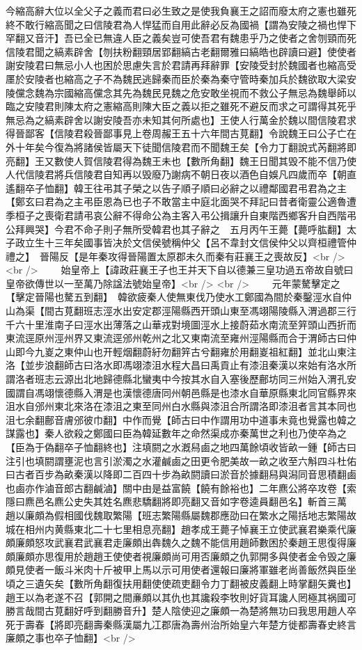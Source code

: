 今縮高辭大位以全父子之義而君曰必生致之是使我負襄王之詔而廢太府之憲也雖死終不敢行縮高聞之曰信陵君為人悍猛而自用此辭必反為國禍【謂為安陵之禍也悍下罕翻又音汗】吾已全已無違人臣之義矣豈可使吾君有魏患乎乃之使者之舍刎頸而死信陵君聞之縞素辟舍【刎扶粉翻頸居郢翻縞古老翻爾雅曰縞皓也辟讀曰避】使使者謝安陵君曰無忌小人也困於思慮失言於君請再拜辭罪【安陵受封於魏國者也縮高受㕓於安陵者也縮高之子不為魏民逃歸秦而臣於秦為秦守管時秦加兵於魏欲取大梁安陵儻念魏為宗國縮高儻念其先為魏民見魏之危安敢坐視而不救公子無忌為魏舉師以臨之安陵君則陳太府之憲縮高則陳大臣之義以拒之雖死不避反而求之可謂得其死乎無忌為之縞素辟舍以謝安陵吾亦未知其何所處也】王使人行萬金於魏以間信陵君求得晉鄙客【信陵君殺晉鄙事見上卷周赧王五十六年間古莧翻】令說魏王曰公子亡在外十年矣今復為將諸侯皆屬天下徒聞信陵君而不聞魏王矣【令力丁翻說式芮翻將即亮翻】王又數使人賀信陵君得為魏王未也【數所角翻】魏王日聞其毁不能不信乃使人代信陵君將兵信陵君自知再以毁廢乃謝病不朝日夜以酒色自娛凡四歲而卒【朝直遙翻卒子恤翻】韓王往弔其子榮之以告子順子順曰必辭之以禮鄰國君弔君為之主【鄭玄曰君為之主弔臣恩為已也子不敢當主中庭北面哭不拜記曰昔者衛靈公適魯遭季桓子之喪衛君請弔哀公辭不得命公為主客入弔公揖讓升自東階西鄉客升自西階弔公拜興哭】今君不命子則子無所受韓君也其子辭之　五月丙午王薨【薨呼肱翻】太子政立生十三年矣國事皆决於文信侯號稱仲父【呂不韋封文信侯仲父以齊桓禮管仲禮之】　晉陽反【是年秦攻得晉陽置太原郡未久而秦有莊襄王之喪故反】<br />
<br />
　　始皇帝上【諱政莊襄王子也王并天下自以德兼三皇功過五帝故自號曰皇帝欲傳世以一至萬乃除諡法號始皇帝】<br />
<br />
　　元年蒙驁擊定之【擊定晉陽也驁五到翻】　韓欲疲秦人使無東伐乃使水工鄭國為間於秦鑿涇水自仲山為渠【間古莧翻班志涇水出安定郡涇陽縣西开頭山東至馮翊陽陵縣入渭過郡三行千六十里淮南子曰涇水出薄落之山華戎對境圖涇水上接蔚茹水南流至笄頭山西折而東流逕原州涇州界又東流逕邠州乾州之北又東南流至雍州涇陽縣而合于渭師古曰仲山即今九嵏之東仲山也开輕烟翻蔚紆勿翻笄古兮翻雍於用翻嵏祖紅翻】並北山東注洛【並步浪翻師古曰洛水即馮翊漆沮水程大昌曰禹貢止有漆沮秦漢以來始有洛水所謂洛者班志云源出北地歸德縣北蠻夷中今按其水自入塞後歷鄜坊同三州始入渭孔安國謂自馮翊懷德縣入渭是也漢懷德唐同州朝邑縣是也漆水自華原縣東北同官縣界來沮水自邠州東北來洛在漆沮之東至同州白水縣與漆沮合所謂洛即漆沮者言其本同也沮七余翻鄜音膚邠彼巾翻】中作而覺【師古曰中作謂用功中道事未竟也覺露也韓之謀露也】秦人欲殺之鄭國曰臣為韓延數年之命然渠成亦秦萬世之利也乃使卒為之【臣為于偽翻卒子恤翻終也】注填閼之水漑舄鹵之地四萬餘頃收皆畝一鍾【師古曰注引也填閼謂壅泥也言引淤濁之水灌鹹鹵之田更令肥美故一畝之收至六斛四斗杜佑曰古者百步為畝秦漢以降即二百四十步為畝閼讀曰淤音於據翻舄與潟同音思積翻鹵也鹵亦作滷音郎古翻鹹滷】關中由是益富饒【饒有餘裕也】二年麃公將卒攻卷【索隱曰麃邑名麃公史失其姓名麃悲驕翻將即亮翻又音如字卷逵員翻邑名】斬首三萬　趙以廉頗為假相國伐魏取繁陽【班志繁陽縣屬魏郡應劭曰在繁水之陽括地志繁陽故城在相州内黄縣東北二十七里相息亮翻】趙孝成王薨子悼襄王立使武襄君樂乘代廉頗廉頗怒攻武襄君武襄君走廉頗出犇魏久之魏不能信用趙師數困於秦趙王思復得廉頗廉頗亦思復用於趙趙王使使者視廉頗尚可用否廉頗之仇郭開多與使者金令毁之廉頗見使者一飯斗米肉十斤被甲上馬以示可用使者還報曰廉將軍雖老尚善飯然與臣坐頃之三遺矢矣【數所角翻復扶用翻使使疏吏翻令力丁翻被皮義翻上時掌翻矢糞也】趙王以為老遂不召【郭開之間亷頗以其仇也其讒殺李牧則好貨耳讒人罔極其祸國可勝言哉間古莧翻好呼到翻勝音升】楚人陰使迎之廉頗一為楚將無功曰我思用趙人卒死于壽春【將即亮翻壽秦縣漢屬九冮郡唐為壽州治所始皇六年楚方徙都壽春史終言廉頗之事也卒子恤翻】<br />
